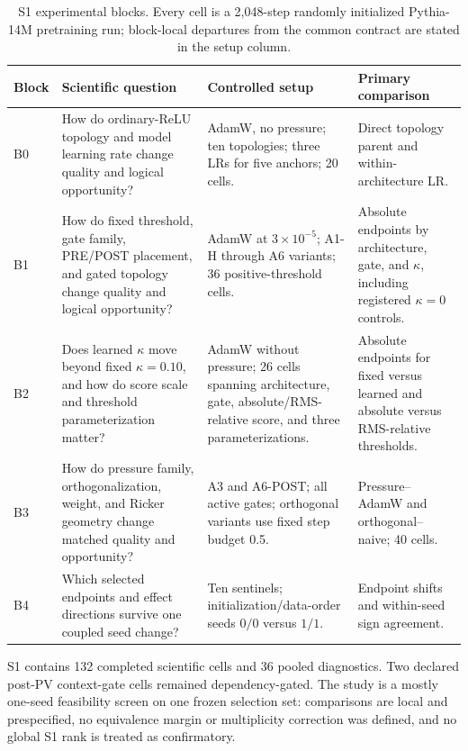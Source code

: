\documentclass[10pt]{article}
\begin{document}
\begin{table}[H]
\centering
\small
\caption{S1 experimental blocks. Every cell is a 2,048-step randomly
initialized Pythia-14M pretraining run; block-local departures from the common
contract are stated in the setup column.}
\label{tab:scope}
\begin{tabularx}{\textwidth}{p{} X X p{}}
\toprule
Block & Scientific question & Controlled setup & Primary comparison \\
\midrule
B0 & How do ordinary-ReLU topology and model learning rate change quality and
logical opportunity? & AdamW, no pressure; ten topologies; three LRs for five
anchors; 20 cells. & Direct topology parent and within-architecture LR. \\
B1 & How do fixed threshold, gate family, PRE/POST placement, and gated
topology change quality and logical opportunity? & AdamW at
\(3\times10^{-5}\); A1-H through A6 variants; 36 positive-threshold cells.
& Absolute endpoints by architecture, gate, and \(\kappa\), including
registered \(\kappa=0\) controls. \\
B2 & Does learned \(\kappa\) move beyond fixed \(\kappa=0.10\), and how do
score scale and threshold parameterization matter? & AdamW without pressure;
26 cells spanning architecture, gate, absolute/RMS-relative score, and three
parameterizations. & Absolute endpoints for fixed versus learned and absolute
versus RMS-relative thresholds. \\
B3 & How do pressure family, orthogonalization, weight, and Ricker geometry
change matched quality and opportunity? & A3 and A6-POST; all active gates;
orthogonal variants use fixed step budget 0.5. & Pressure--AdamW and
orthogonal--naive; 40 cells. \\
B4 & Which selected endpoints and effect directions survive one coupled seed
change? & Ten sentinels; initialization/data-order seeds \(0/0\) versus
\(1/1\). & Endpoint shifts and within-seed sign agreement. \\
\bottomrule
\end{tabularx}
\end{table}

S1 contains 132 completed scientific cells and 36 pooled diagnostics. Two
declared post-PV context-gate cells remained dependency-gated. The study is a
mostly one-seed feasibility screen on one frozen selection set: comparisons
are local and prespecified, no equivalence margin or multiplicity correction
was defined, and no global S1 rank is treated as confirmatory.
\end{document}
